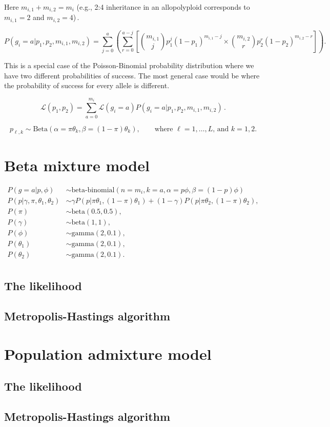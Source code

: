 \documentclass[11pt,english,letterpaper,oneside]{article}
\begin{document}
Here $m_{i,1} + m_{i,2} = m_i$ (e.g., 2:4 inheritance in an allopolyploid corresponds to $m_{i,1}=2$ and $m_{i,2}=4$)\,.

\begin{equation}
P(g_i = a|p_1, p_2, m_{i,1}, m_{i,2}) = \sum_{j=0}^a \left(  \sum_{r=0}^{a-j} \left[ \binom{m_{i,1}}{j} p_1^j (1 - p_1)^{m_{i,1} - j} \times \binom{m_{i,2}}{r} p_2^r (1 - p_2)^{m_{i,2} - r} \right] \right).
\end{equation}

This is a special case of the Poisson-Binomial probability distribution where we have two different probabilities of success. The most general case would be where the probability of success for every allele is different.

\begin{equation}
\mathcal{L}(p_1,p_2) = \sum_{a=0}^{m_i} \mathcal{L}(g_i = a) P(g_i = a|p_1, p_2, m_{i,1}, m_{i,2})\,.
\end{equation}

\begin{equation}
p_{\ell,k} \sim \text{Beta}(\alpha = \pi \theta_k, \beta = (1 - \pi) \theta_k), \qquad \text{where } \ell = 1,\ldots,L \text{,  and  } k = 1,2.
\end{equation}

\section{Beta mixture model}

\begin{align*}
P(g=a|p,\phi) &\sim \text{beta-binomial}(n=m_i, k = a, \alpha = p\phi, \beta = (1-p)\phi) \\
P(p|\gamma, \pi, \theta_1, \theta_2) &\sim \gamma P(p|\pi\theta_1, (1-\pi)\theta_1) + (1-\gamma)P(p|\pi\theta_2, (1-\pi)\theta_2), \\
P(\pi) &\sim \text{beta}(0.5, 0.5), \\
P(\gamma) &\sim \text{beta}(1,1), \\
P(\phi) &\sim \text{gamma}(2,0.1), \\
P(\theta_1) &\sim \text{gamma}(2,0.1), \\
P(\theta_2) &\sim \text{gamma}(2,0.1). \\
\end{align*}

\subsection{The likelihood}

\subsection{Metropolis-Hastings algorithm}

\section{Population admixture model}

\subsection{The likelihood}

\subsection{Metropolis-Hastings algorithm}
\end{document}
